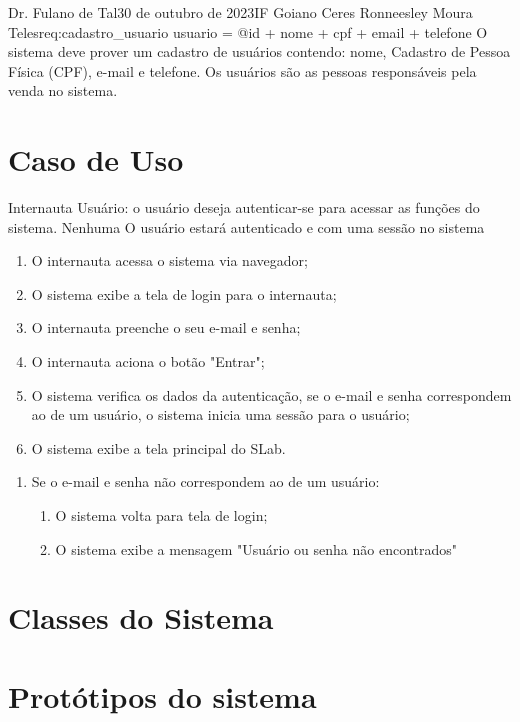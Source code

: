 {Dr. Fulano de Tal}{30 de outubro de 2023}{IF Goiano Ceres}
{Ronneesley Moura Teles}{req:cadastro_usuario}
{usuario = @id + nome + cpf + email + telefone}
{
O sistema deve prover um cadastro de usuários contendo: nome,
Cadastro de Pessoa Física (CPF), e-mail e telefone.
Os usuários são as pessoas responsáveis pela venda no sistema.
}

\section{Caso de Uso}

{Internauta}
{Usuário: o usuário deseja autenticar-se para acessar as funções do sistema.}
{Nenhuma}
{O usuário estará autenticado e com uma sessão no sistema}
{
	\begin{enumerate}[label=FB\arabic*.]
		\item O internauta acessa o sistema via navegador;
		
		\item O sistema exibe a tela de login para o internauta;
		
		\item O internauta preenche o seu e-mail e senha;
		
		\item O internauta aciona o botão "Entrar";
		
		\item O sistema verifica os dados da autenticação,
		se o e-mail e senha correspondem ao de um usuário, 
		o sistema inicia uma sessão para o usuário;
		
		\item O sistema exibe a tela principal do SLab.
	\end{enumerate}
}{
	\begin{enumerate}[label=FA\arabic*.]
		\item Se o e-mail e senha não correspondem ao de um usuário:
			\begin{enumerate}
				\item O sistema volta para tela de login;
				
				\item O sistema exibe a mensagem "Usuário ou senha não encontrados"
			\end{enumerate}
	\end{enumerate}
}{}{}

\section{Classes do Sistema}

\section{Protótipos do sistema}